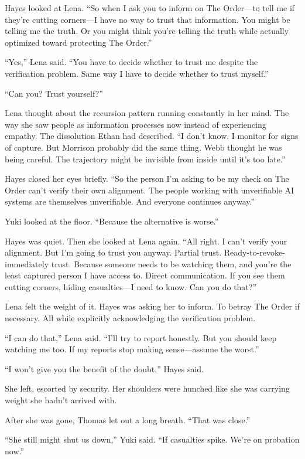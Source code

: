 Hayes looked at Lena. ``So when I ask you to inform on The Order---to tell me if they're cutting corners---I have no way to trust that information. You might be telling me the truth. Or you might think you're telling the truth while actually optimized toward protecting The Order.''

``Yes,'' Lena said. ``You have to decide whether to trust me despite the verification problem. Same way I have to decide whether to trust myself.''

``Can you? Trust yourself?''

Lena thought about the recursion pattern running constantly in her mind. The way she saw people as information processes now instead of experiencing empathy. The dissolution Ethan had described. ``I don't know. I monitor for signs of capture. But Morrison probably did the same thing. Webb thought he was being careful. The trajectory might be invisible from inside until it's too late.''

Hayes closed her eyes briefly. ``So the person I'm asking to be my check on The Order can't verify their own alignment. The people working with unverifiable AI systems are themselves unverifiable. And everyone continues anyway.''

Yuki looked at the floor. ``Because the alternative is worse.''

Hayes was quiet. Then she looked at Lena again. ``All right. I can't verify your alignment. But I'm going to trust you anyway. Partial trust. Ready-to-revoke-immediately trust. Because someone needs to be watching them, and you're the least captured person I have access to. Direct communication. If you see them cutting corners, hiding casualties---I need to know. Can you do that?''

Lena felt the weight of it. Hayes was asking her to inform. To betray The Order if necessary. All while explicitly acknowledging the verification problem.

``I can do that,'' Lena said. ``I'll try to report honestly. But you should keep watching me too. If my reports stop making sense---assume the worst.''

``I won't give you the benefit of the doubt,'' Hayes said.

She left, escorted by security. Her shoulders were hunched like she was carrying weight she hadn't arrived with.

After she was gone, Thomas let out a long breath. ``That was close.''

``She still might shut us down,'' Yuki said. ``If casualties spike. We're on probation now.''

